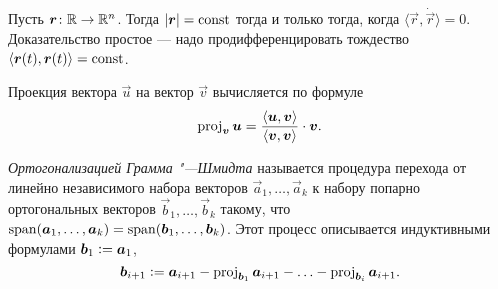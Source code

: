 Пусть $\vec{r}\colon \R \to \R^n$. Тогда $\abs{\vec{r}} = \const$ тогда и только тогда, когда $\langle \vec{r}, \dot{\vec{r}} \rangle = 0$. Доказательство простое --- надо продифференцировать тождество $\langle \vec{r}(t), \vec{r}(t) \rangle = \const$.

Проекция вектора $\vec{u}$ на вектор $\vec{v}$ вычисляется по формуле
\[
	\proj_{\vec{v}}\vec{u} = \frac{\langle\vec{u}, \vec{v}\rangle}{\langle\vec{v}, \vec{v}\rangle} \cdot \vec{v}.
\]

\textit{Ортогонализацией Грамма "---Шмидта} называется процедура перехода от линейно независимого набора векторов $\vec{a}_1, \ldots, \vec{a}_k$ к набору попарно ортогональных векторов $\vec{b}_1, \ldots, \vec{b}_k$ такому, что $\span(\vec{a}_1, \ldots, \vec{a}_k) = \span(\vec{b}_1, \ldots, \vec{b}_k)$. Этот процесс описывается индуктивными формулами $\vec{b}_1 \vcentcolon = \vec{a}_1$,
\[
	\vec{b}_{i + 1} \vcentcolon = \vec{a}_{i + 1} - \proj_{\vec{b}_1}\vec{a}_{i + 1} - \ldots - \proj_{\vec{b}_i}\vec{a}_{i + 1}.
\]

